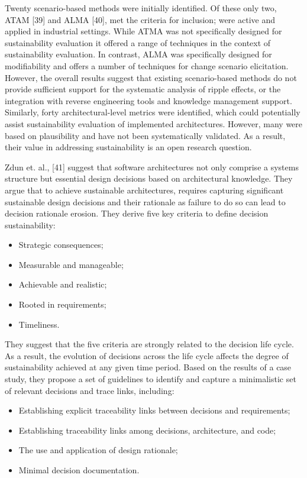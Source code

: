 \documentclass[preprint,12pt,authoryear]{elsarticle}
\begin{document}
Twenty scenario-based methods were initially identified. Of these only
two, ATAM [39] and ALMA [40], met the criteria for inclusion; were
active and applied in industrial settings. While ATMA was not
specifically designed for sustainability evaluation it offered a range
of techniques in the context of sustainability evaluation. In
contrast, ALMA was specifically designed for modifiability and offers
a number of techniques for change scenario elicitation. However, the
overall results suggest that existing scenario-based methods do not
provide sufficient support for the systematic analysis of ripple
effects, or the integration with reverse engineering tools and
knowledge management support. Similarly, forty architectural-level
metrics were identified, which could potentially assist sustainability
evaluation of implemented architectures. However, many were based on
plausibility and have not been systematically validated. As a result,
their value in addressing sustainability is an open research question.

Zdun et. al., [41] suggest that software architectures not only
comprise a systems structure but essential design decisions based on
architectural knowledge. They argue that to achieve sustainable
architectures, requires capturing significant sustainable design
decisions and their rationale as failure to do so can lead to decision
rationale erosion. They derive five key criteria to define decision
sustainability:

\begin{itemize}
\item Strategic consequences;
\item Measurable and manageable;
\item Achievable and realistic;
\item Rooted in requirements;
\item Timeliness.
\end{itemize}

They suggest that the five criteria are strongly related to the
decision life cycle. As a result, the evolution of decisions across
the life cycle affects the degree of sustainability achieved at any
given time period. Based on the results of a case study, they propose
a set of guidelines to identify and capture a minimalistic set of
relevant decisions and trace links, including:

\begin{itemize}
\item Establishing explicit traceability links between decisions and
requirements;
\item Establishing traceability links among decisions, architecture,
and code;
\item The use and application of design rationale;
\item Minimal decision documentation.
\end{itemize}
\end{document}
